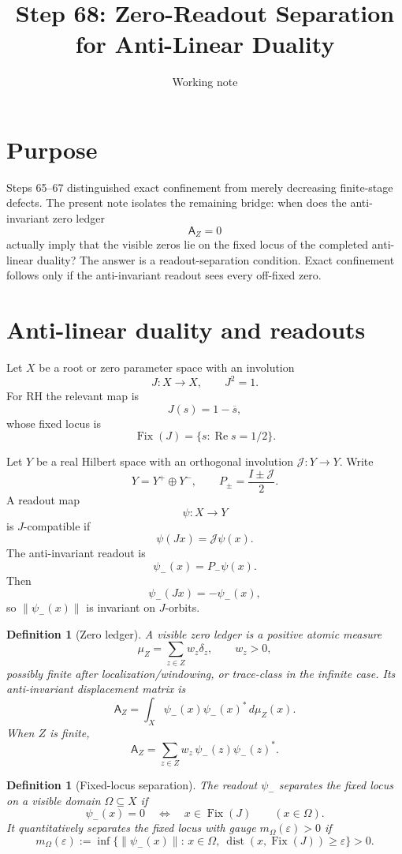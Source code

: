 \documentclass[11pt]{article}
\title{Step 68: Zero-Readout Separation for Anti-Linear Duality}
\author{Working note}
\date{}
\newtheorem{definition}[theorem]{Definition}
\newcommand{\FixSetx}{\operatorname{Fix}}
\newcommand{\dist}{\operatorname{dist}}
\begin{document}
\maketitle

\section{Purpose}
Steps 65--67 distinguished exact confinement from merely decreasing finite-stage defects.  The present note isolates the remaining bridge: when does the anti-invariant zero ledger
\[
  \mathsf A_Z=0
\]
actually imply that the visible zeros lie on the fixed locus of the completed anti-linear duality?  The answer is a readout-separation condition.  Exact confinement follows only if the anti-invariant readout sees every off-fixed zero.

\section{Anti-linear duality and readouts}
Let $X$ be a root or zero parameter space with an involution
\[
  J:X\to X,\qquad J^2=1.
\]
For RH the relevant map is
\[
  J(s)=1-\overline{s},
\]
whose fixed locus is
\[
  \FixSetx(J)=\{s:\operatorname{Re}s=1/2\}.
\]

Let $Y$ be a real Hilbert space with an orthogonal involution $\mathcal J:Y\to Y$.  Write
\[
  Y=Y^+\oplus Y^-,\qquad P_\pm=\frac{I\pm\mathcal J}{2}.
\]
A readout map
\[
  \psi:X\to Y
\]
is $J$-compatible if
\[
  \psi(Jx)=\mathcal J\psi(x).
\]
The anti-invariant readout is
\[
  \psi_-(x)=P_-\psi(x).
\]
Then
\[
  \psi_-(Jx)=-\psi_-(x),
\]
so $\|\psi_-(x)\|$ is invariant on $J$-orbits.

\begin{definition}[Zero ledger]
A visible zero ledger is a positive atomic measure
\[
  \mu_Z=\sum_{z\in Z}w_z\delta_z,\qquad w_z>0,
\]
possibly finite after localization/windowing, or trace-class in the infinite case.  Its anti-invariant displacement matrix is
\[
  \mathsf A_Z=\int_X \psi_-(x)\psi_-(x)^*\,d\mu_Z(x).
\]
When $Z$ is finite,
\[
  \mathsf A_Z=\sum_{z\in Z} w_z\,\psi_-(z)\psi_-(z)^*.
\]
\end{definition}

\begin{definition}[Fixed-locus separation]
The readout $\psi_-$ separates the fixed locus on a visible domain $\Omega\subseteq X$ if
\[
  \psi_-(x)=0\quad\Longleftrightarrow\quad x\in\FixSetx(J)
  \qquad (x\in\Omega).
\]
It quantitatively separates the fixed locus with gauge $m_\Omega(\varepsilon)>0$ if
\[
  m_\Omega(\varepsilon)
  :=\inf\{\|\psi_-(x)\|:\,x\in\Omega,\ \dist(x,\FixSetx(J))\ge\varepsilon\}>0.
\]
\end{definition}
\end{document}
